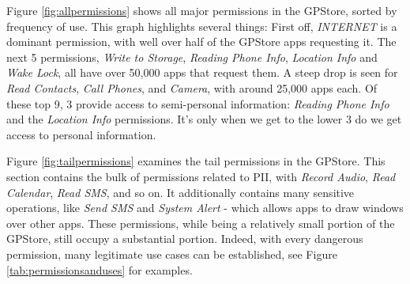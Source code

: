 Figure \ref{fig:allpermissions} shows all major permissions in the GPStore, sorted by frequency of use. This graph highlights several things: First off, \textit{INTERNET} is a dominant permission, with well over half of the GPStore apps requesting it. The next 5 permissions, \textit{Write to Storage}, \textit{Reading Phone Info}, \textit{Location Info} and \textit{Wake Lock}, all have over 50,000 apps that request them. A steep drop is seen for \textit{Read Contacts}, \textit{Call Phones}, and \textit{Camera}, with around 25,000 apps each. Of these top 9, 3 provide access to semi-personal information: \textit{Reading Phone Info} and the \textit{Location Info} permissions. It's only when we get to the lower 3 do we get access to personal information. 

Figure \ref{fig:tailpermissions} examines the tail permissions in the GPStore. This section contains the bulk of permissions related to PII, with \textit{Record Audio}, \textit{Read Calendar}, \textit{Read SMS}, and so on. It additionally contains many sensitive operations, like \textit{Send SMS} and \textit{System Alert} - which allows apps to draw windows over other apps. These permissions, while being a relatively small portion of the GPStore, still occupy a substantial portion. Indeed, with every dangerous permission, many legitimate use cases can be established, see Figure \ref{tab:permissionsanduses} for examples.


